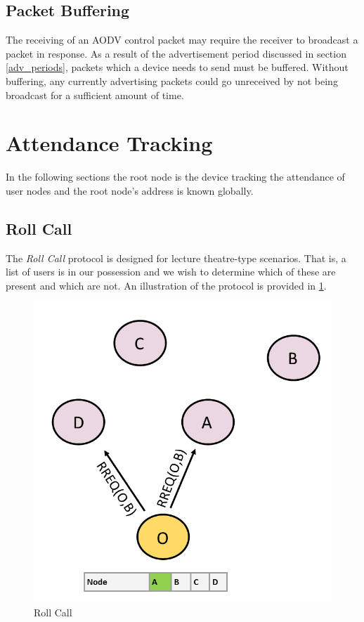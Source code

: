       \subsection{Packet Buffering}
    The receiving of an AODV control packet may require the receiver to broadcast
    a packet in response. As a result of the advertisement period discussed in section
    \ref{adv_periods}, packets which a device needs to send must be buffered.
    Without buffering, any currently advertising packets could go unreceived by
    not being broadcast for a sufficient amount of time.

    \section{Attendance Tracking}
    In the following sections the root node is the device tracking the attendance
    of user nodes and the root node's address is known globally.

      \subsection{Roll Call}
    The \textit{Roll Call} protocol is designed for lecture theatre-type scenarios.
    That is, a list of users is in our possession and we wish to determine which
    of these are present and which are not. An illustration of the protocol is
    provided in \ref{fig:roll_call}.

    \FloatBarrier
    \begin{figure}[ht]
      \includegraphics[scale=0.5]{Images/chapter3/roll_call.png}
      \caption{Roll Call}
      \label{fig:roll_call}
    \end{figure}
    \FloatBarrier

